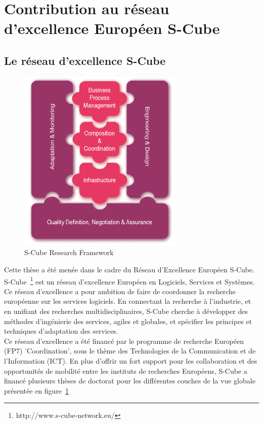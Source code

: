 \section{Contribution au réseau d'excellence Européen S-Cube}

\subsection{Le réseau d'excellence S-Cube}

\begin{figure}
  \centering
  \includegraphics[width=.5\textwidth]{part1/pics/scube-overview.png}
  \caption{S-Cube Research Framework}
  \label{fig:scube-overview}
\end{figure}


Cette thèse a été menée dans le cadre du Réseau d'Excellence Européen S-Cube.
S-Cube~\footnote{http://www.s-cube-network.eu/} est un réseau d'excellence Européen en Logiciels, Services et Systèmes. Ce réseau d'excellence a pour ambition de faire de coordonner la recherche européenne sur les services logiciels. En connectant la recherche à l'industrie, et en unifiant des recherches multidisciplinaires, S-Cube cherche à développer des méthodes d'ingénierie des services, agiles et globales, et spécifier les principes et techniques d'adaptation des services.\\
Ce réseau d'excellence a été financé par le programme de recherche Européen (FP7) 'Coordination', sous le thème des Technologies de la Communication et de l'Information (ICT). En plus d'offrir un fort support pour les collaboration et des opportunités de mobilité entre les instituts de recherches Européens, S-Cube a financé plusieurs thèses de doctorat pour les différentes couches de la vue globale présentée en figure~\ref{fig:scube-overview}\\


